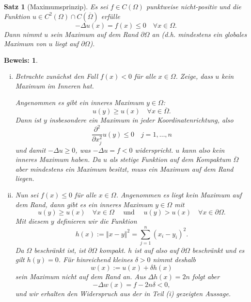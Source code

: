 \documentclass[
]{mycourse}
\theoremstyle{mythm}
\newtheorem{theorem}{Satz}[chapter]
\theoremstyle{break}
\newtheorem*{beweis}{Beweis:}
\newcommand{\norm}[1]{\left\Vert#1\right\Vert}		%
\newcommand{\labeq}[1]{\label{eq:#1}}			%
\begin{document}
\begin{theorem}[Maximumsprinzip]\label{satz:maxprinzip}
Es sei $f\in C(\Omega)$ punktweise nicht-positiv und die Funktion $u\in C^2(\Omega)\cap C(\overline \Omega)$ erfülle
\begin{equation}\labeq{laplace}
-\Delta u(x)=f(x)\leq 0 \quad \forall x\in \Omega.
\end{equation}
Dann nimmt $u$ sein Maximum auf dem Rand $\partial \Omega$ an (d.h. mindestens ein globales Maximum von $u$ liegt auf  $\partial \Omega$).
\end{theorem}
\begin{beweis}
\begin{enumerate}[(i)]
\item Betrachte zunächst den Fall $f(x)<0$ für alle $x\in \Omega$. Zeige, dass $u$ kein Maximum im Inneren hat.

Angenommen es gibt ein inneres Maximum $y\in \Omega$:
\[
u(y)\geq u(x) \quad \forall x\in \overline{\Omega}.
\]
Dann ist $y$ insbesondere ein Maximum in jeder Koordinatenrichtung, also
\[
\frac{\partial^2}{\partial x_j^2} u(y)\leq 0 \quad j=1,\ldots,n
\]
und damit $-\Delta u\geq 0$, was $-\Delta u=f<0$ widerspricht. $u$ kann also kein 
inneres Maximum haben. Da $u$ als stetige Funktion auf dem Kompaktum $\overline \Omega$ aber mindestens ein Maximum besitzt, muss ein Maximum auf dem Rand liegen.
%
\item Nun sei $f(x)\leq 0$ für alle $x\in \Omega$. 
Angenommen es liegt kein Maximum auf dem Rand, dann gibt es ein inneres Maximum $y\in \Omega$ mit
\[
u(y)\geq u(x) \quad \forall x\in \Omega\quad \mbox{ und } \quad
u(y)> u(x) \quad \forall x\in \partial \Omega.
\]
Mit diesem $y$ definieren wir die Funktion
\[
h(x):=\norm{x-y}^2=\sum_{j=1}^n (x_i-y_i)^2.
\]
Da $\Omega$ beschränkt ist, ist $\partial \Omega$ kompakt. 
$h$ ist auf also auf $\partial \Omega$ beschränkt und es gilt $h(y)=0$. Für hinreichend kleines $\delta>0$ nimmt deshalb 
\[
w(x):=u(x)+\delta h(x)
\]
sein Maximum nicht auf dem Rand an. Aus $\Delta h(x)=2n$ folgt aber
\[
-\Delta w(x)=f-2n\delta<0,
\]
und wir erhalten den Widerspruch aus der in Teil (i) gezeigten Aussage.
\end{enumerate}
\end{beweis}
\end{document}
